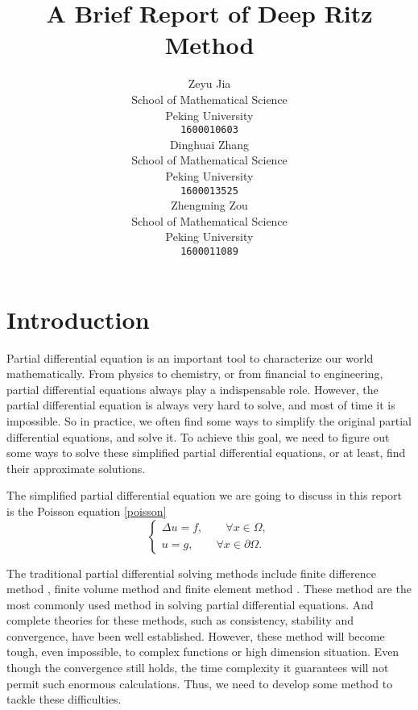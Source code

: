 \documentclass{article}
\title{A Brief Report of Deep Ritz Method}
\author{
  Zeyu Jia\\School of Mathematical Science\\Peking University\\ \texttt{1600010603} \\
  \And
  Dinghuai Zhang\\School of Mathematical Science\\Peking University\\ \texttt{1600013525}\\
  \And
  Zhengming Zou\\School of Mathematical Science\\Peking University \\ \texttt{1600011089}
}
\begin{document}

\maketitle

\begin{abstract}
\end{abstract}

\section{Introduction}
\par Partial differential equation \cite{evans1998partial} is an important tool to characterize our world mathematically. From physics to chemistry, or from financial to engineering, partial differential equations always play a indispensable role. However, the partial differential equation is always very hard to solve, and most of time it is impossible. So in practice, we often find some ways to simplify the original partial differential equations, and solve it. To achieve this goal, we need to figure out some ways to solve these simplified partial differential equations, or at least, find their approximate solutions.
\par The simplified partial differential equation we are going to discuss in this report is the Poisson equation 
\eqref{poisson}
\begin{equation}\label{poisson}
	\begin{cases}
		\Delta u = f, \qquad\forall x\in\Omega,\\
		u = g, \qquad\forall x\in\partial\Omega.
	\end{cases}
\end{equation}
\par The traditional partial differential solving methods include finite difference method \cite{strikwerda2004finite}, finite volume method \cite{versteeg2007introduction} and finite element method \cite{brenner2007mathematical}. These method are the most commonly used method in solving partial differential equations. And complete theories for these methods, such as consistency, stability and convergence, have been well established. However, these method will become tough, even impossible, to complex functions or high dimension situation. Even though the convergence still holds, the time complexity it guarantees will not permit such enormous calculations. Thus, we need to develop some method to tackle these difficulties.
\end{document}
